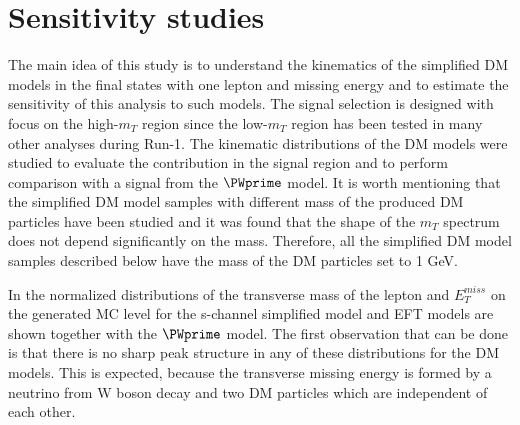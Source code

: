 


















\section{Sensitivity studies}

The main idea of this study is to understand the kinematics of the simplified DM models in the final states with one lepton and missing energy and to estimate the sensitivity of this analysis to such models.
The signal selection is designed with focus on the high-$m_{T}$ region 
since the low-$m_T$ region has been tested in many other analyses during Run-1.
The kinematic distributions of the DM models were studied to evaluate the contribution in the signal region and to perform comparison with a signal from the $\PWprime$ model.
It is worth mentioning that the simplified DM model samples with different mass of the produced DM particles have been studied and it was found that the shape of the $m_T$ spectrum does not depend significantly on the mass. Therefore, all the simplified DM model samples described below have the mass of the DM particles set to 1 GeV.

In  the normalized distributions of the transverse mass of the lepton and $E_{T}^{miss}$ on the generated MC level
for the s-channel simplified model and EFT models are shown together with the $\PWprime$ model.
The first observation that can be done is that there is no sharp peak structure in any of these distributions for the DM models.
This is expected, because the transverse missing energy is formed by
a neutrino from W boson decay and two DM particles which are independent of each other. 

